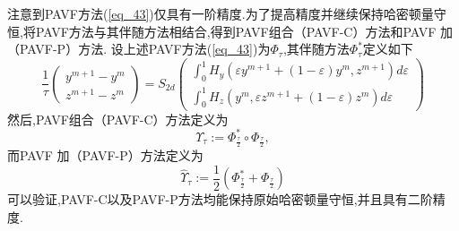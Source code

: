 注意到PAVF方法(\ref{eq_43})仅具有一阶精度\cite{caiPartitionedAveragedVector2018}.为了提高精度并继续保持哈密顿量守恒,将PAVF方法与其伴随方法相结合,得到PAVF组合（PAVF-C）方法和PAVF 加（PAVF-P）方法.
设上述PAVF方法(\ref{eq_43})为$\Phi_{\tau}$,其伴随方法$\Phi_{\tau}^{*}$定义如下
\begin{equation}
\frac{1}{\tau}\left(\begin{array}{c}
y^{m+1}-y^{m} \\
z^{m+1}-z^{m}
\end{array}\right)=S_{2 d}\left(\begin{array}{c}
\int_{0}^{1} H_{y}\left(\varepsilon y^{m+1}+(1-\varepsilon) y^{m}, z^{m+1}\right) d \varepsilon \\
\int_{0}^{1} H_{z}\left(y^{m}, \varepsilon z^{m+1}+(1-\varepsilon) z^{m}\right) d \varepsilon
\end{array}\right)
\label{eq_44}\end{equation}
然后,PAVF组合（PAVF-C）方法定义为
\begin{equation}
\Upsilon_{\tau}:=\Phi_{\frac{\tau}{2}}^{*} \circ \Phi_{\frac{\tau}{2}},
\label{eq_45}\end{equation}
而PAVF 加（PAVF-P）方法定义为
\begin{equation}
\hat{\Upsilon}_{\tau}:=\frac{1}{2}\left(\Phi_{\frac{\tau}{2}}^{*}+\Phi_{\frac{\tau}{2}}\right)
\label{eq_46}\end{equation}
可以验证,PAVF-C以及PAVF-P方法均能保持原始哈密顿量守恒,并且具有二阶精度\cite{caiPartitionedAveragedVector2018}.




